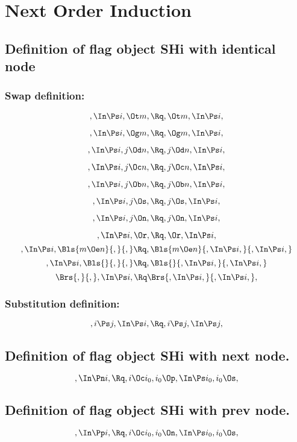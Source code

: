 
\chapter{Next Order Induction}
\section{Definition of flag object SHi with identical node}


\subsection{Swap definition:}
\[,\In \Ps i, \Ot m, \Rq , \Ot m, \In \Ps i,\]

\[,\In \Ps i, \Og m, \Rq , \Og m, \In \Ps i,\]

\[,\In \Ps i, j \Od n, \Rq , j \Od n, \In \Ps i,\]

\[,\In \Ps i, j \Oc n, \Rq , j \Oc n, \In \Ps i,\]

\[,\In \Ps i, j \Ob n, \Rq , j \Ob n, \In \Ps i,\]

\[,\In \Ps i, j \Os, \Rq , j \Os, \In \Ps i,\]

\[,\In \Ps i, j \On, \Rq , j \On, \In \Ps i,\]

\[,\In \Ps i, \Or, \Rq , \Or, \In \Ps i,\]
\bigskip
\[,\In \Ps i, \Bls{m \Oe n}{,}{,} \Rq , \Bls{m \Oe n}{,\In \Ps i,}{,\In \Ps i,}\]
\bigskip
\[,\In \Ps i, \Bls{}{,}{,} \Rq , \Bls{}{,\In \Ps i,}{,\In \Ps i,}\]
\bigskip
\[ \Brs{,}{,},\In \Ps i, \Rq \Brs{,\In \Ps i,}{,\In \Ps i,},\]




\bigskip
\bigskip
\subsection{Substitution definition:}
\[,i \Ps j, \In \Ps i, \Rq , i\Ps j, \In \Ps j,\]



\bigskip
\bigskip
\bigskip
\bigskip
\section{Definition of flag object SHi with next node.}
\[, \In \Pn i, \Rq , i \Oc i_0, i_0 \Op, \In \Ps i_0, i_0 \Os,\]

\bigskip
\bigskip
\bigskip
\bigskip
\section{Definition of flag object SHi with prev node.}
\[, \In \Pp i, \Rq , i \Oc i_0, i_0 \On, \In \Ps i_0, i_0 \Os,\]


